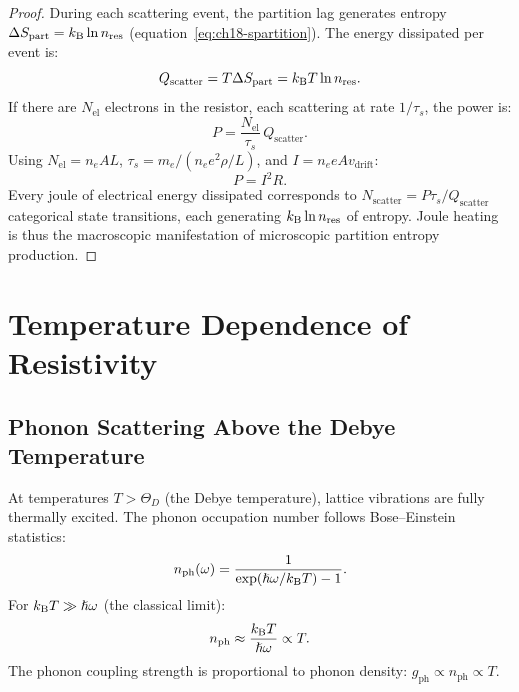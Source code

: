 \begin{proof}
During each scattering event, the partition lag generates entropy
$\Delta S_{\mathrm{part}} = k_{\mathrm{B}}\ln n_{\mathrm{res}}$
(equation~\eqref{eq:ch18-spartition}).  The energy dissipated per event
is:
\begin{equation}
  Q_{\mathrm{scatter}} = T\Delta S_{\mathrm{part}}
    = k_{\mathrm{B}} T \ln n_{\mathrm{res}}.
\end{equation}
If there are $N_{\mathrm{el}}$ electrons in the resistor, each scattering
at rate $1/\tau_s$, the power is:
\begin{equation}
  P = \frac{N_{\mathrm{el}}}{\tau_s}\,Q_{\mathrm{scatter}}.
\end{equation}
Using $N_{\mathrm{el}} = n_e A L$, $\tau_s = m_e/(n_e e^2 \rho/L)$, and
$I = n_e e A v_{\mathrm{drift}}$:
\begin{equation}
  P = I^2 R.
\end{equation}
Every joule of electrical energy dissipated corresponds to
$N_{\mathrm{scatter}} = P\tau_s/Q_{\mathrm{scatter}}$ categorical state
transitions, each generating $k_{\mathrm{B}}\ln n_{\mathrm{res}}$ of entropy.
Joule heating is thus the macroscopic manifestation of microscopic
partition entropy production.
\end{proof}

\section{Temperature Dependence of Resistivity}
\label{sec:ch18-temperature}

\subsection{Phonon Scattering Above the Debye Temperature}

At temperatures $T > \Theta_D$ (the Debye temperature), lattice vibrations
are fully thermally excited.  The phonon occupation number follows
Bose--Einstein statistics:
\begin{equation}
  n_{\mathrm{ph}}(\omega) = \frac{1}{\exp(\hslash\omega/k_{\mathrm{B}} T) - 1}.
  \label{eq:ch18-bose}
\end{equation}
For $k_{\mathrm{B}} T \gg \hslash\omega$ (the classical limit):
\begin{equation}
  n_{\mathrm{ph}} \approx \frac{k_{\mathrm{B}} T}{\hslash\omega} \propto T.
  \label{eq:ch18-phononhight}
\end{equation}
The phonon coupling strength is proportional to phonon density:
$g_{\mathrm{ph}} \propto n_{\mathrm{ph}} \propto T$.

